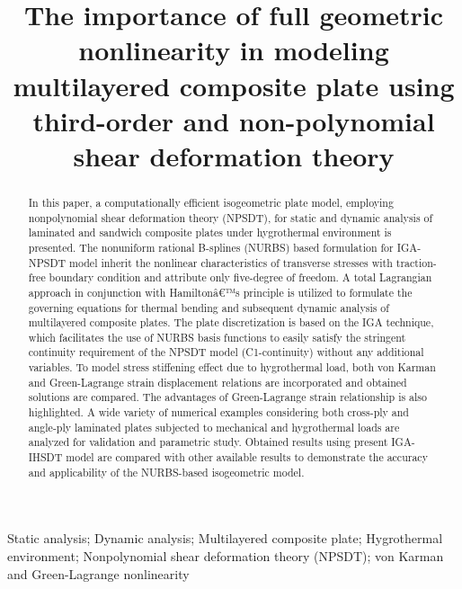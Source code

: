 \documentclass[]{interact}
\begin{document}
\nocite{*}



\title{The importance of full geometric nonlinearity in modeling multilayered composite plate using third-order and non-polynomial shear deformation theory}

  
\author{
}

\maketitle 


\begin{abstract}
In this paper, a computationally efficient isogeometric plate model,
employing nonpolynomial shear deformation theory (NPSDT), for static
and dynamic analysis of laminated and sandwich composite plates under
hygrothermal environment is presented. The nonuniform rational B-splines
(NURBS) based formulation for IGA-NPSDT model inherit the nonlinear
characteristics of transverse stresses with traction-free boundary
condition and attribute only five-degree of freedom. A total Lagrangian
approach in conjunction with Hamiltonâ€™s principle is utilized to formulate
the governing equations for thermal bending and subsequent dynamic
analysis of multilayered composite plates. The plate discretization
is based on the IGA technique, which facilitates the use of NURBS
basis functions to easily satisfy the stringent continuity requirement
of the NPSDT model (C1-continuity) without any additional variables.
To model stress stiffening effect due to hygrothermal load, both von
Karman and Green-Lagrange strain displacement relations are incorporated
and obtained solutions are compared. The advantages of Green-Lagrange
strain relationship is also highlighted. A wide variety of numerical
examples considering both cross-ply and angle-ply laminated plates
subjected to mechanical and hygrothermal loads are analyzed for validation
and parametric study. Obtained results using present IGA-IHSDT model
are compared with other available results to demonstrate the accuracy
and applicability of the NURBS-based isogeometric model.
\end{abstract}
\def\keywordstitle{Keywords}
\begin{keywords}
Static analysis; Dynamic analysis; Multilayered composite plate; Hygrothermal
environment; Nonpolynomial shear deformation theory (NPSDT); von Karman
and Green-Lagrange nonlinearity
\end{keywords}
\end{document}
